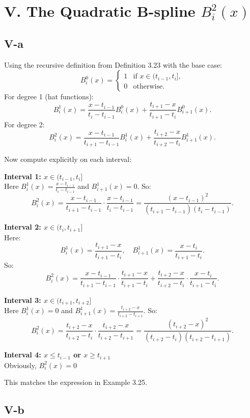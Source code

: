 \documentclass[a4paper]{article}
\begin{document}
\section*{V. The Quadratic B-spline \( B_i^2(x) \)}

\subsection*{V-a}

Using the recursive definition from Definition 3.23 with the base case:
\[
B_i^0(x) = \begin{cases} 1 & \text{if } x \in (t_{i-1}, t_i], \\ 0 & \text{otherwise}. \end{cases}
\]
For degree 1 (hat functions):
\[
B_i^1(x) = \frac{x - t_{i-1}}{t_i - t_{i-1}} B_i^0(x) + \frac{t_{i+1} - x}{t_{i+1} - t_i} B_{i+1}^0(x).
\]
For degree 2:
\[
B_i^2(x) = \frac{x - t_{i-1}}{t_{i+1} - t_{i-1}} B_i^1(x) + \frac{t_{i+2} - x}{t_{i+2} - t_i} B_{i+1}^1(x).
\]

Now compute explicitly on each interval:

\textbf{Interval 1: \( x \in (t_{i-1}, t_i] \)} \\
Here \( B_i^1(x) = \frac{x - t_{i-1}}{t_i - t_{i-1}} \) and \( B_{i+1}^1(x) = 0 \). So:
\[
B_i^2(x) = \frac{x - t_{i-1}}{t_{i+1} - t_{i-1}} \cdot \frac{x - t_{i-1}}{t_i - t_{i-1}} = \frac{(x - t_{i-1})^2}{(t_{i+1} - t_{i-1})(t_i - t_{i-1})}.
\]

\textbf{Interval 2: \( x \in (t_i, t_{i+1}] \)} \\
Here:
\[
B_i^1(x) = \frac{t_{i+1} - x}{t_{i+1} - t_i}, \quad B_{i+1}^1(x) = \frac{x - t_i}{t_{i+1} - t_i}.
\]
So:
\[
B_i^2(x) = \frac{x - t_{i-1}}{t_{i+1} - t_{i-1}} \cdot \frac{t_{i+1} - x}{t_{i+1} - t_i} + \frac{t_{i+2} - x}{t_{i+2} - t_i} \cdot \frac{x - t_i}{t_{i+1} - t_i}.
\]

\textbf{Interval 3: \( x \in (t_{i+1}, t_{i+2}] \)} \\
Here \( B_i^1(x) = 0 \) and \( B_{i+1}^1(x) = \frac{t_{i+2} - x}{t_{i+2} - t_{i+1}} \). So:
\[
B_i^2(x) = \frac{t_{i+2} - x}{t_{i+2} - t_i} \cdot \frac{t_{i+2} - x}{t_{i+2} - t_{i+1}} = \frac{(t_{i+2} - x)^2}{(t_{i+2} - t_i)(t_{i+2} - t_{i+1})}.
\]

\textbf{Interval 4: $x \le t_{i-1}$ or $x \ge t_{i+1}$} \\
Obviously, $B_i^2(x) = 0$

This matches the expression in Example 3.25.

\subsection*{V-b}
\end{document}
